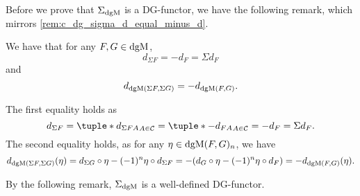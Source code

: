 Before we prove that \( \Sigma_{\operatorname{dgM}} \) is a DG-functor, we have the following remark, which mirrors \autoref{rem:c_dg_sigma_d_equal_minus_d}.

\begin{remark}
    We have that for any \( F, G \in \operatorname{dgM} \),
    \[
        d_{\Sigma F} = -d_F = \Sigma d_F
    \]
    and
    \[
        d_{\operatorname{dgM}(\Sigma F, \Sigma G)} = - d_{\operatorname{dgM}(F, G)}.
    \]

    The first equality holds as
    \[
        d_{\Sigma F} = \tuple*{d_{\Sigma F A}}_{A \in \Cc} = \tuple*{-d_{F A}}_{A \in \Cc} = - d_F = \Sigma d_F.
    \]
    The second equality holds, as for any \( \eta \in \operatorname{dgM}(F, G)_n \), we have
    \[
        d_{\operatorname{dgM}(\Sigma F, \Sigma G)} (\eta) = d_{\Sigma G} \circ \eta - (-1)^n \eta \circ d_{\Sigma F} = - (d_G \circ \eta - (-1)^n \eta \circ d_F) = - d_{\operatorname{dgM}(F, G)} (\eta).
    \]
\end{remark}

By the following remark, \( \Sigma_{\operatorname{dgM}} \) is a well-defined DG-functor.

